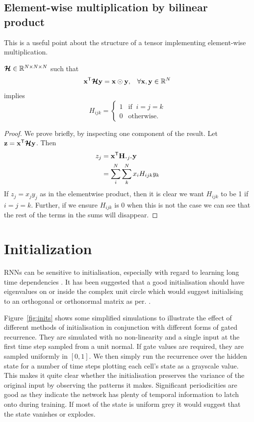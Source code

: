 \section{Element-wise multiplication by bilinear product}
This is a useful point about the structure of a tensor implementing element-wise
multiplication.
\begin{prop}  \label{prop:identity}
	\(\bm{\mathcal{H}} \in \mathbb{R}^{N \times N \times N}\) such that
\begin{align}
\mathbf{x}^\mathsf{T}\bm{\mathcal{H}}\mathbf{y} = \mathbf{x} \odot \mathbf{y}, 
&&\forall \mathbf{x},\mathbf{y} \in \mathbb{R}^{N}
\end{align} implies
\begin{equation}
	H_{ijk} = \begin{cases}
		1 & \text{if}\;\;i = j = k \\
		0 & \text{otherwise.}
	\end{cases}
\end{equation}

\end{prop}
\begin{proof}
We prove briefly, by inspecting one component of the result. Let 
\(\mathbf{z} = \mathbf{x}^\mathsf{T}\bm{\mathcal{H}}\mathbf{y}\). Then
\begin{align}
	z_j &= \vec{x}^\mathsf{T}\mat{H}_{\midbullet j \midbullet}\vec{y} \\
		&= \sum_i^N\sum_k^N x_iH_{ijk}y_k
\end{align}
If \(z_j = x_jy_j\) as in the elementwise product, then it is clear we want \(H_{ijk}\) to be 
1 if \(i=j=k\). Further, if we ensure \(H_{ijk}\) is 0 when this is not the case we can see that
the rest of the terms in the sums will disappear.
\end{proof}

\chapter{Initialization}\label{A:init}
RNNs can be sensitive to initialisation, especially with regard to learning long
time dependencies \autocite{Le2015}. It has been suggested that a good initialisation should
have eigenvalues on or inside the complex unit circle \autocite{Zilly2016, Mikolov2015} which
would suggest initialising to an orthogonal or orthonormal matrix as per. \autocite{Henaff2016}.

Figure~\ref{fig:inits} shows some simplified simulations to illustrate the effect of
different methods of initialisation in conjunction with different forms of gated recurrence. They are
simulated with no non-linearity and a single input at the first time step sampled from a unit
normal. If gate values are required, they are sampled uniformly in \([0,1]\). We then simply
run the recurrence over the hidden state for a number of time steps plotting each cell's state
as a grayscale value. This makes it quite clear whether the initialisation preserves the variance
of the original input by observing the patterns it makes. Significant periodicities are
good as they indicate the network has plenty of temporal information to latch onto during
training. If most of the state is uniform grey it would suggest that the state vanishes
or explodes.

